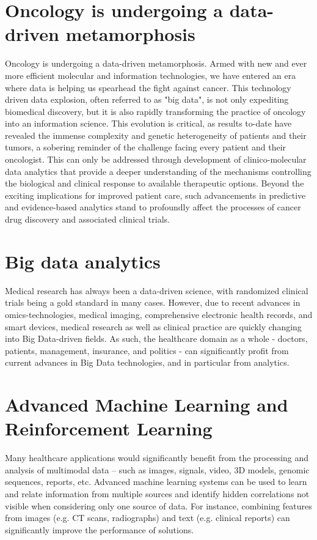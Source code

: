 \documentclass[sigconf]{acmart}
\begin{document}
\section{Oncology is undergoing a data-driven metamorphosis}
Oncology is undergoing a data-driven metamorphosis. Armed with new and ever more efficient molecular and information technologies, we have entered an era where data is helping us spearhead the fight against cancer. This technology driven data explosion, often referred to as "big data", is not only expediting biomedical discovery, but it is also rapidly transforming the practice of oncology into an information science. This evolution is critical, as results to-date have revealed the immense complexity and genetic heterogeneity of patients and their tumors, a sobering reminder of the challenge facing every patient and their oncologist. This can only be addressed through development of clinico-molecular data analytics that provide a deeper understanding of the mechanisms controlling the biological and clinical response to available therapeutic options. Beyond the exciting implications for improved patient care, such advancements in predictive and evidence-based analytics stand to profoundly affect the processes of cancer drug discovery and associated clinical trials.

\section{Big data analytics}
Medical research has always been a data-driven science, with randomized clinical trials being a gold
standard in many cases. However, due to recent advances in omics-technologies, medical imaging,
comprehensive electronic health records, and smart devices, medical research as well as clinical
practice are quickly changing into Big Data-driven fields. As such, the healthcare domain as a whole -
doctors, patients, management, insurance, and politics - can significantly profit from current advances
in Big Data technologies, and in particular from analytics. 

\section{Advanced Machine Learning and Reinforcement Learning 
}
Many healthcare applications would significantly benefit from the processing and analysis of multimodal
data – such as images, signals, video, 3D models, genomic sequences, reports, etc. Advanced
machine learning systems can be used to learn and relate information from multiple sources and
identify hidden correlations not visible when considering only one source of data. For instance,
combining features from images (e.g. CT scans, radiographs) and text (e.g. clinical reports) can
significantly improve the performance of solutions. 
\end{document}
